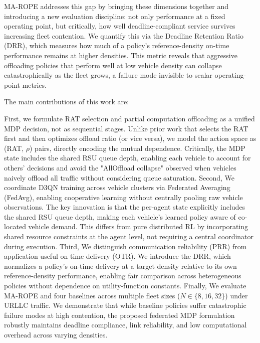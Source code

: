 MA-ROPE addresses this gap by bringing these dimensions together and introducing a new evaluation discipline: not only performance at a fixed operating point, but critically, how well deadline-compliant service survives increasing fleet contention. We quantify this via the Deadline Retention Ratio (DRR), which measures how much of a policy's reference-density on-time performance remains at higher densities. This metric reveals that aggressive offloading policies that perform well at low vehicle density can collapse catastrophically as the fleet grows, a failure mode invisible to scalar operating-point metrics.

The main contributions of this work are:


First, we formulate RAT selection and partial computation offloading as a unified MDP decision, not as sequential stages. Unlike prior work that selects the RAT first and then optimizes offload ratio (or vice versa), we model the action space as (RAT, $\rho$) pairs, directly encoding the mutual dependence. Critically, the MDP state includes the shared RSU queue depth, enabling each vehicle to account for others' decisions and avoid the "AllOffload collapse" observed when vehicles naively offload all traffic without considering queue saturation.
Second, We coordinate D3QN training across vehicle clusters via Federated Averaging (FedAvg), enabling cooperative learning without centrally pooling raw vehicle observations. The key innovation is that the per-agent state explicitly includes the shared RSU queue depth, making each vehicle's learned policy aware of co-located vehicle demand. This differs from pure distributed RL by incorporating shared resource constraints at the agent level, not requiring a central coordinator during execution.
Third, We distinguish communication reliability (PRR) from application-useful on-time delivery (OTR). We introduce the DRR, which normalizes a policy's on-time delivery at a target density relative to its own reference-density performance, enabling fair comparison across heterogeneous policies without dependence on utility-function constants.
Finally, We evaluate MA-ROPE and four baselines across multiple fleet sizes ($N \in \{8, 16, 32\}$) under URLLC traffic. We demonstrate that while baseline policies suffer catastrophic failure modes at high contention, the proposed federated MDP formulation robustly maintains deadline compliance, link reliability, and low computational overhead across varying densities.

